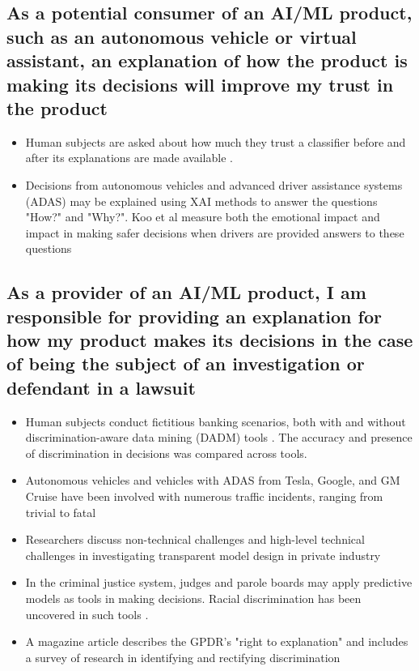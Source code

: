 \subsection{As a potential consumer of an AI/ML product, such as an autonomous vehicle or virtual assistant, an explanation of how the product is making its decisions will improve my trust in the product}

\begin{itemize}
    \item Human subjects are asked about how much they trust a classifier before and after its explanations are made available \cite{Ribeiro:2016:WIT:2939672.2939778}.  
    \item Decisions from autonomous vehicles and advanced driver assistance systems (ADAS) may be explained using XAI methods to answer the questions "How?" and "Why?".  Koo et al measure both the emotional impact and impact in making safer decisions when drivers are provided answers to these questions \cite{Koo2015}
\end{itemize}

\subsection{As a provider of an AI/ML product, I am responsible for providing an explanation for how my product makes its decisions in the case of being the subject of an investigation or defendant in a lawsuit}

\begin{itemize}
    \item Human subjects conduct fictitious banking scenarios, both with and without discrimination-aware data mining (DADM) tools \cite{Berendt2014}.  The accuracy and presence of discrimination in decisions was compared across tools.
    \item Autonomous vehicles and vehicles with ADAS from Tesla, Google, and GM Cruise have been involved with numerous traffic incidents, ranging from trivial to fatal \cite{Read2016} \cite{Tesla2018} \cite{Ackerman2016} \cite{Bhavsar2017} 
    \item Researchers discuss non-technical challenges and high-level technical challenges in investigating transparent model design in private industry \cite{Veale:2018:FAD:3173574.3174014}
    \item In the criminal justice system, judges and parole boards may apply predictive models as tools in making decisions.  Racial discrimination has been uncovered in such tools \cite{Wexler.2017} \cite{Angwin2016}.
    \item A magazine article describes the GPDR's "right to explanation" and includes a survey of research in identifying and rectifying discrimination \cite{Goodman2017EuropeanUR}
\end{itemize}

